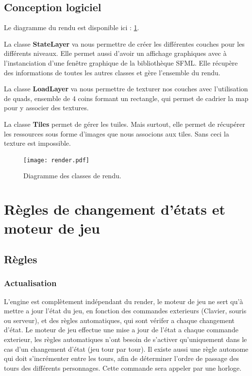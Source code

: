 \documentclass[a4paper,12pt]{article}
\begin{document}
\subsection{Conception logiciel}
Le diagramme du rendu est disponible ici : \ref{uml:render}.\\
\par
La classe \textbf{StateLayer} va nous permettre de créer les différentes couches pour les différents niveaux. Elle permet aussi d'avoir un affichage graphiques avec à l'instanciation d'une fenêtre graphique de la bibliothèque SFML. Elle récupère des informations de toutes les autres classes et gère l'ensemble du rendu.\\
\par
La classe \textbf{LoadLayer} va nous permettre de texturer nos couches avec l'utilisation de quads, ensemble de 4 coins formant un rectangle, qui permet de cadrier la map pour y associer des textures.\\
\par
La classe \textbf{Tiles} permet de gérer les tuiles. Mais surtout, elle permet de récupérer les ressources sous forme d'images que nous associons aux tiles. Sans ceci la texture est impossible.\\


\begin{landscape}
\begin{figure}[p]
\texttt{[image: render.pdf]}
\caption{\label{uml:render}Diagramme des classes de rendu.} 
\end{figure}
\end{landscape}

\clearpage
\section{Règles de changement d'états et moteur de jeu}

\subsection{Règles}

\subsubsection{Actualisation}

L'engine est complètement indépendant du render, le moteur de jeu
ne sert qu'à mettre a jour l'état du jeu, en fonction des commandes exterieurs 
(Clavier, souris ou serveur), et des règles automatiques, qui sont vérifer a chaque 
changement d'état. Le moteur de jeu effectue une mise a jour de l'état a chaque
commande exterieur, les règles automatiques n'ont besoin de s'activer qu'uniquement 
dans le cas d'un changement d'état (jeu tour par tour). Il existe aussi une règle 
autonome qui doit s'incrémenter entre les tours, afin de déterminer l'ordre de passage
des tours des différents personnages. Cette commande sera appeler par une horloge.
\end{document}
